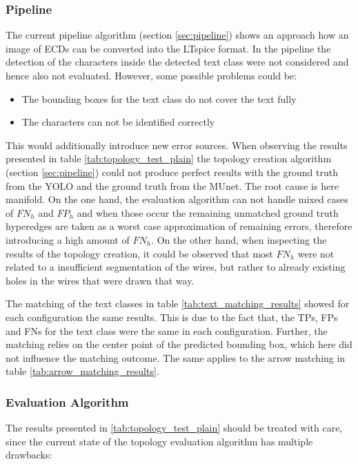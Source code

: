 \subsubsection{Pipeline}

The current pipeline algorithm (section \ref{sec:pipeline}) shows an approach how an image of \acp{ECD} can be converted into the LTspice format.
In the pipeline the detection of the characters inside the detected text class were not considered and hence also not evaluated.
However, some possible problems could be:

\begin{itemize}
    \item The bounding boxes for the text class do not cover the text fully
    \item The characters can not be identified correctly
\end{itemize}

This would additionally introduce new error sources.
When observing the results presented in table \ref{tab:topology_test_plain} the topology creation algorithm (section \ref{sec:pipeline}) could not produce perfect results with the ground truth from the \ac{YOLO} and the ground truth from the \ac{MUnet}.
The root cause is here manifold.
On the one hand, the evaluation algorithm can not handle mixed cases of $FN_h$ and $FP_h$ and when those occur the remaining unmatched ground truth hyperedges are taken as a worst case approximation of remaining errors, therefore introducing a high amount of $FN_h$.
On the other hand, when inspecting the results of the topology creation, it could be observed that most $FN_h$ were not related to a insufficient segmentation of the wires, but rather to already existing holes in the wires that were drawn that way.

The matching of the text classes in table \ref{tab:text_matching_results} showed for each configuration the same results.
This is due to the fact that, the \acp{TP}, \acp{FP} and \acp{FN} for the text class were the same in each configuration.
Further, the matching relies on the center point of the predicted bounding box, which here did not influence the matching outcome.
The same applies to the arrow matching in table \ref{tab:arrow_matching_results}.

\subsubsection{Evaluation Algorithm}

The results presented in \ref{tab:topology_test_plain} should be treated with care, since the current state of the topology evaluation algorithm has multiple drawbacks:

